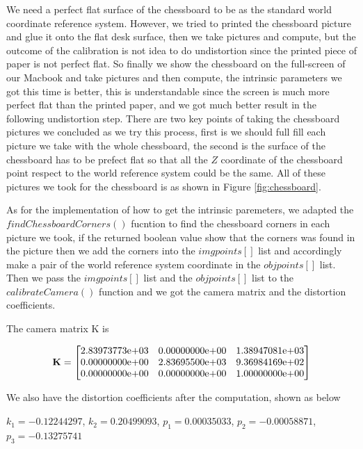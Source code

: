 \documentclass[10pt,twocolumn,letterpaper]{article}
\begin{document}
We need a perfect flat surface of the chessboard to be as the standard world coordinate reference system. However, we tried to printed the chessboard picture and glue it onto the flat desk surface, then we take pictures and compute, but the outcome of the calibration is not idea to do undistortion since the printed piece of paper is not perfect flat. So finally we show the chessboard on the full-screen of our Macbook and take pictures and then compute, the intrinsic parameters we got this time is better, this is understandable since the screen is much more perfect flat than the printed paper, and we got much better result in the following undistortion step. There are two key points of taking the chessboard pictures we concluded as we try this process, first is we should full fill each picture we take with the whole chessboard, the second is the surface of the chessboard has to be prefect flat so that all the $Z$ coordinate of the chessboard point respect to the world reference system could be the same. All of these pictures we took for the chessboard is as shown in Figure \ref{fig:chessboard}.

As for the implementation of how to get the intrinsic paremeters, we adapted the $findChessboardCorners( )$ fucntion to find the chessboard corners in each picture we took, if the returned boolean value show that the corners was found in the picture then we add the corners into the $imgpoints[ ]$ list and accordingly make a pair of the world reference system coordinate in the $objpoints[ ]$ list. Then we pass the $imgpoints[ ]$ list and the $objpoints[ ]$ list to the $calibrateCamera( )$ function and we got the camera matrix and the distortion coefficients. 

The camera matrix K is 

$$\textbf{K} =
\begin{bmatrix}
2.83973773{\text e+}03&0.00000000{\text e+}00&1.38947081{\text e+}03\\
0.00000000{\text e+}00&2.83695500{\text e+}03&9.36984169{\text e+}02\\
0.00000000{\text e+}00&0.00000000{\text e+}00&1.00000000{\text e+}00 
\end{bmatrix}
$$

We also have the distortion coefficients after the computation, shown as below

$k_{1} = -0.12244297$, $k_{2} = 0.20499093$, $p_{1} = 0.00035033$, $p_{2} = -0.00058871$, $p_{3} = -0.13275741$
\end{document}
